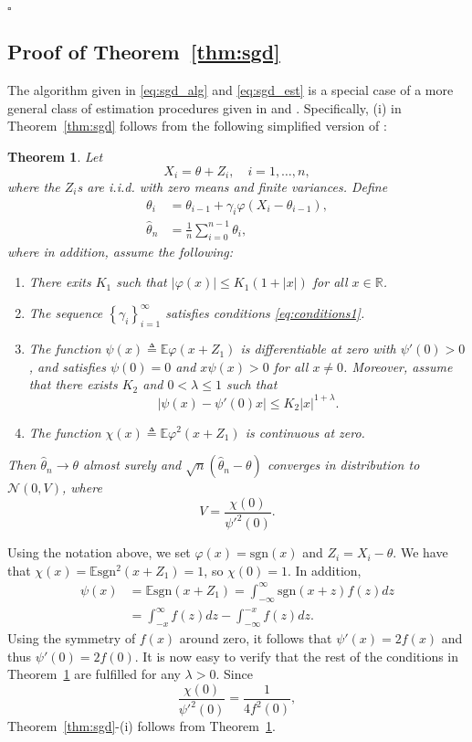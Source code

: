 \documentclass[letterpaper, 11pt]{IEEEtran}      %
\newtheorem{thm}{\bf{Theorem}}
\newcommand{\sgn}{\mathrm{sgn} }
\newcommand*{\QEDA}{\hfill\ensuremath{\square}}
\begin{document}
\QEDA

\subsection*{Proof of Theorem~\ref{thm:sgd}}
The algorithm given in \eqref{eq:sgd_alg} and \eqref{eq:sgd_est} is a special case of a more general class of estimation procedures given in \cite{polyak1992acceleration} and \cite{polyak1990new}. Specifically, (i) in Theorem~\ref{thm:sgd} follows from the following simplified version of \cite[Thm. 4]{polyak1992acceleration}:
\begin{thm}{\cite[Thm. 4]{polyak1992acceleration}} \label{thm:polyak_juditsky}
Let 
\[
X_i = \theta + Z_i,\quad i=1,\ldots,n,
\]
where the $Z_i$s are i.i.d. with zero means and finite variances. Define
\begin{align*}
\theta_i & = \theta_{i-1} + \gamma_i \varphi(X_i - \theta_{i-1}), \\
\hat{\theta}_n & = \frac{1}{n} \sum_{i=0}^{n-1} \theta_i, 
\end{align*}
where in addition, assume the following: 
\begin{enumerate}
\item[(i)] There exits $K_1$ such that $\left| \varphi(x) \right| \leq K_1(1+|x|)$ for all $x\in \mathbb R$.
\item[(ii)] The sequence $\left\{ \gamma_i \right\}_{i=1}^\infty$ satisfies conditions \eqref{eq:conditions1}.
\item[(iii)] The function $\psi(x) \triangleq \mathbb E \varphi(x+Z_1)$ is differentiable at zero with $\psi'(0)>0$, and satisfies $\psi(0)=0$ and $x\psi(x) >0$ for all $x\neq 0$.
Moreover, assume that there exists $K_2$ and $0<\lambda \leq 1$ such that
\begin{equation}
\label{eq:Polyak_Juditsky_cond3}
\left| \psi(x) - \psi'(0)x \right|\leq K_2 |x|^{1+\lambda}.
\end{equation}
\item[(iv)] The function 
$\chi(x) \triangleq \mathbb E \varphi^2(x+Z_1)$ is continuous at zero. 
\end{enumerate}
Then $\hat{\theta}_n \rightarrow \theta$ almost surely and $ \sqrt{n}(\hat{\theta}_n - \theta)$ converges in distribution to $\mathcal N(0,V)$, where
\[
V = \frac{ \chi(0)} {\psi'^2(0)}. 
\]
\end{thm}

Using the notation above, we set $\varphi(x) = \sgn(x)$ and $Z_i = X_i - \theta$. We have that $\chi(x) = \mathbb E \sgn^2(x+Z_1) = 1$, so $\chi(0) = 1$. In addition,
\begin{align*}
\psi(x) & = \mathbb E \sgn(x+ Z_1) = \int_{-\infty}^\infty \sgn(x+z) f(z) dz \\
& = \int_{-x}^\infty f(z) dz -\int_{-\infty}^{-x} f(z) dz. 
\end{align*}
Using the symmetry of $f(x)$ around zero, it follows that $\psi'(x) = 2f(x)$ and thus $\psi'(0) = 2f(0)$. It is now easy to verify that the rest of the conditions in Theorem~\ref{thm:polyak_juditsky} are fulfilled for any $\lambda > 0$. Since 
\[
\frac{\chi(0)}{\psi'^2(0)} = \frac{1}{4 f^2(0)},
\]
Theorem~\ref{thm:sgd}-(i) follows from Theorem~\ref{thm:polyak_juditsky}.  \\
\end{document}

